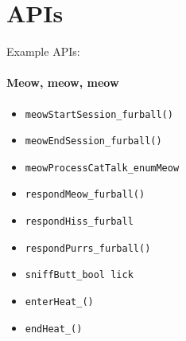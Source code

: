 \section{APIs}\label{sec:apis}

 Example APIs:

\paragraph{Meow, meow, meow}\label{api:protocol_zero}

\begin{itemize}
\tightlist
\item
  \texttt{meowStartSession\_furball()}
\item
  \texttt{meowEndSession\_furball()}
\item
  \texttt{meowProcessCatTalk\_enumMeow}
\item
  \texttt{respondMeow\_furball()}
\item
  \texttt{respondHiss\_furball}
\item
  \texttt{respondPurrs\_furball()}
\item
  \texttt{sniffButt\_bool lick}
\item
  \texttt{enterHeat\_()}
\item
  \texttt{endHeat\_()}
\end{itemize}



